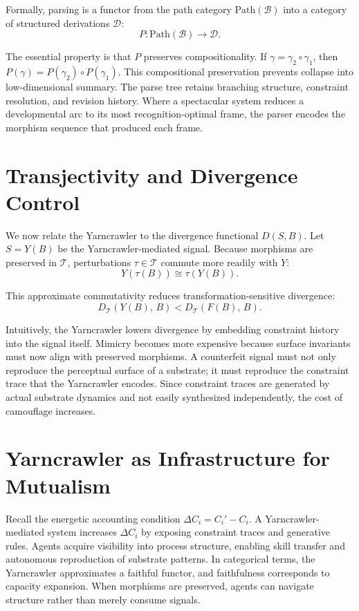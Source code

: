 \documentclass[11pt]{article}
\begin{document}
Formally, parsing is a functor from the path category $\mathrm{Path}(\mathcal{B})$ into a category of structured derivations $\mathcal{D}$:
\[
P : \mathrm{Path}(\mathcal{B}) \to \mathcal{D}.
\]

The essential property is that $P$ preserves compositionality. If $\gamma = \gamma_2 \circ \gamma_1$, then $P(\gamma) = P(\gamma_2) \circ P(\gamma_1)$. This compositional preservation prevents collapse into low-dimensional summary. The parse tree retains branching structure, constraint resolution, and revision history. Where a spectacular system reduces a developmental arc to its most recognition-optimal frame, the parser encodes the morphism sequence that produced each frame.

\section{Transjectivity and Divergence Control}

We now relate the Yarncrawler to the divergence functional $D(S,B)$. Let $S = Y(B)$ be the Yarncrawler-mediated signal. Because morphisms are preserved in $\mathcal{T}$, perturbations $\tau \in \mathcal{T}$ commute more readily with $Y$:
\[
Y(\tau(B)) \cong \tau(Y(B)).
\]

This approximate commutativity reduces transformation-sensitive divergence:
\[
D_{\mathcal{T}}(Y(B),\, B) < D_{\mathcal{T}}(F(B),\, B).
\]

Intuitively, the Yarncrawler lowers divergence by embedding constraint history into the signal itself. Mimicry becomes more expensive because surface invariants must now align with preserved morphisms. A counterfeit signal must not only reproduce the perceptual surface of a substrate; it must reproduce the constraint trace that the Yarncrawler encodes. Since constraint traces are generated by actual substrate dynamics and not easily synthesized independently, the cost of camouflage increases.

\section{Yarncrawler as Infrastructure for Mutualism}

Recall the energetic accounting condition $\Delta C_i = C_i' - C_i$. A Yarncrawler-mediated system increases $\Delta C_i$ by exposing constraint traces and generative rules. Agents acquire visibility into process structure, enabling skill transfer and autonomous reproduction of substrate patterns. In categorical terms, the Yarncrawler approximates a faithful functor, and faithfulness corresponds to capacity expansion. When morphisms are preserved, agents can navigate structure rather than merely consume signals.
\end{document}
